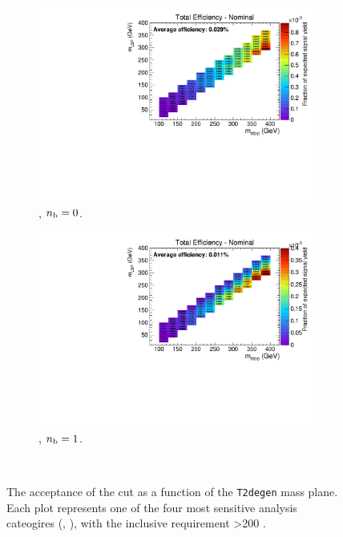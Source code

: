 \begin{figure}[h!]
\begin{subfigure}[b]{0.4\textwidth}
    \includegraphics[width=\textwidth, page=3]{Figs/sms/t2degen/v5/MHT_MET_T2_4body_v5_eq0b_ge4j_incl.pdf}
    \caption{\njhigh, $n_{\text{b}} = 0$.}
  \end{subfigure}
  \begin{subfigure}[b]{0.4\textwidth}
    \includegraphics[width=\textwidth, page=3]{Figs/sms/t2degen/v5/MHT_MET_T2_4body_v5_eq1b_ge4j_incl.pdf}
    \caption{\njhigh, $n_{\text{b}} = 1$.}
  \end{subfigure}\\
  \caption{The acceptance of the \mhtmet cut as a function of the \texttt{T2degen}
  mass plane. Each plot represents one of the four most sensitive 
  analysis cateogires (\nb, \nj), with the inclusive requirement \HT>200 \gev.}
  \label{fig:sms-mhtmet-t2degen}
\end{figure}


